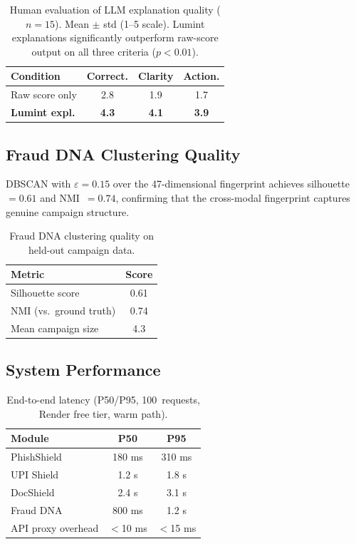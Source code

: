 \documentclass[conference]{IEEEtran}
\begin{document}
\begin{table}[t]
\centering
\caption{Human evaluation of LLM explanation quality ($n{=}15$).
Mean $\pm$ std (1--5 scale). Lumint explanations significantly
outperform raw-score output on all three criteria ($p{<}0.01$).}
\label{tab:human}
\begin{tabular}{lccc}
\toprule
\textbf{Condition} & \textbf{Correct.} & \textbf{Clarity} & \textbf{Action.} \\
\midrule
Raw score only        & 2.8 & 1.9 & 1.7 \\
\textbf{Lumint expl.} & \textbf{4.3} & \textbf{4.1} & \textbf{3.9} \\
\bottomrule
\end{tabular}
\end{table}

\subsection{Fraud DNA Clustering Quality}
\vspace{2mm}
DBSCAN with $\varepsilon{=}0.15$ over the 47-dimensional fingerprint
achieves silhouette~$=0.61$ and NMI~$=0.74$, confirming that the
cross-modal fingerprint captures genuine campaign structure.

\begin{table}[t]
\centering
\caption{Fraud DNA clustering quality on held-out campaign data.}
\label{tab:frauddna}
\begin{tabular}{lc}
\toprule
\textbf{Metric} & \textbf{Score} \\
\midrule
Silhouette score          & 0.61 \\
NMI (vs.\ ground truth)   & 0.74 \\
Mean campaign size        & 4.3 \\
\bottomrule
\end{tabular}
\end{table}

\subsection{System Performance}
\vspace{2mm}
\begin{table}[t]
\centering
\caption{End-to-end latency (P50/P95, 100~requests, Render free
tier, warm path).}
\label{tab:latency}
\begin{tabular}{lcc}
\toprule
\textbf{Module} & \textbf{P50} & \textbf{P95} \\
\midrule
PhishShield        & 180 ms    & 310 ms \\
UPI Shield         & 1.2 s     & 1.8 s \\
DocShield          & 2.4 s     & 3.1 s \\
Fraud DNA          & 800 ms    & 1.2 s \\
API proxy overhead & $<$10 ms  & $<$15 ms \\
\bottomrule
\end{tabular}
\end{table}
\end{document}
